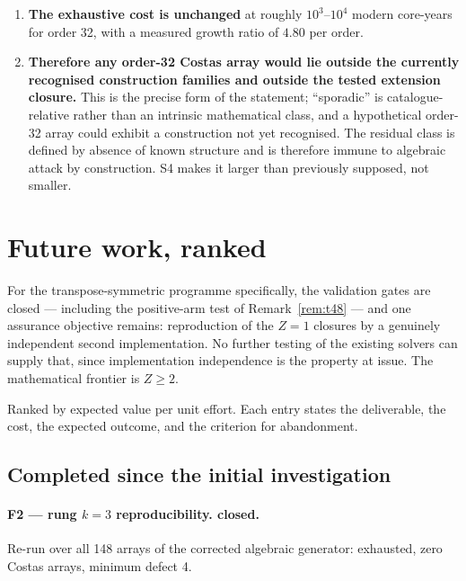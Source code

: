 \documentclass[11pt,a4paper]{article}
\theoremstyle{definition}
\begin{document}
\begin{enumerate}[label=\textbf{S\arabic*.},leftmargin=*]
\item \textbf{The exhaustive cost is unchanged} at roughly $10^3$--$10^4$ modern
core-years for order 32, with a measured growth ratio of $4.80$ per order.

\item \textbf{Therefore any order-32 Costas array would lie outside the
currently recognised construction families and outside the tested extension
closure.} This is the precise form of the statement; ``sporadic'' is
catalogue-relative rather than an intrinsic mathematical class, and a
hypothetical order-32 array could exhibit a construction not yet recognised. The
residual class is defined by absence of known structure and is therefore immune
to algebraic attack by construction. S4 makes it larger than previously supposed,
not smaller.

\end{enumerate}

\section{Future work, ranked}

For the transpose-symmetric programme specifically, the validation gates are
closed --- including the positive-arm test of Remark~\ref{rem:t48} --- and one
assurance objective remains: reproduction of the $Z=1$ closures by a genuinely
independent second implementation. No further testing of the existing solvers
can supply that, since implementation independence is the property at issue. The
mathematical frontier is $Z\ge2$.

\label{sec:future}

Ranked by expected value per unit effort. Each entry states the deliverable, the
cost, the expected outcome, and the criterion for abandonment.

\subsection*{Completed since the initial investigation}

\paragraph{F2 --- rung $k=3$ reproducibility. \textbf{closed}.} Re-run over all
148 arrays of the corrected algebraic generator: exhausted, zero Costas arrays,
minimum defect 4.
\end{document}

